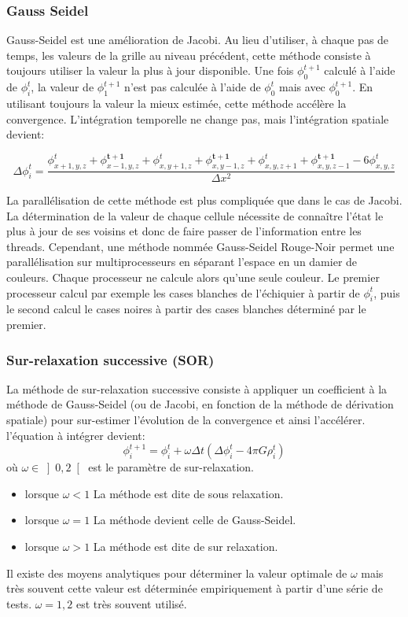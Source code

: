 \subsubsection{Gauss Seidel}
Gauss-Seidel est une amélioration de Jacobi. Au lieu d'utiliser, à chaque pas de temps, les valeurs de la grille au niveau précédent, cette méthode consiste à toujours utiliser la valeur la plus à jour disponible. Une fois $\phi^{t+1}_0$ calculé à l'aide de $\phi^{t}_i$, la valeur de $\phi^{t+1}_1$ n'est pas calculée à l'aide de $\phi^{t}_0$ mais avec $\phi^{t+1}_0$. En utilisant toujours la valeur la mieux estimée, cette méthode accélère la convergence. L'intégration temporelle ne change pas, mais l'intégration spatiale devient: 

\[ \Delta \phi_i^t = \dfrac{\phi_{x+1,y,z}^t  + \phi_{x-1,y,z}^\mathbf{t+1} + \phi_{x,y+1,z}^t  + \phi_{x,y-1,z}^\mathbf{t+1} + \phi_{x,y,z+1}^t + \phi_{x,y,z-1}^\mathbf{t+1}	- 6\phi_{x,y,z}^t}{\Delta x ^2} \]

La parallélisation de cette méthode est plus compliquée que dans le cas de Jacobi. La détermination de la valeur de chaque cellule nécessite de connaître l'état le plus à jour de ses voisins et donc de faire passer de l'information entre les threads.
 Cependant, une méthode nommée Gauss-Seidel Rouge-Noir permet une parallélisation sur multiprocesseurs en séparant l'espace en un damier de couleurs. Chaque processeur ne calcule alors qu'une seule couleur. Le premier processeur calcul par exemple les cases blanches de l'échiquier à partir de $\phi_i^t$, puis le second calcul le cases noires à partir des cases blanches déterminé par le premier.


\subsubsection{Sur-relaxation successive (SOR)}
La méthode de sur-relaxation successive consiste à appliquer un coefficient à la méthode de Gauss-Seidel (ou de Jacobi, en fonction de la méthode de dérivation spatiale) pour sur-estimer l'évolution de la convergence et ainsi l'accélérer. l'équation à intégrer devient:
\[ \phi^{t+1}_i = \phi^{t}_i + \omega  \Delta t \left (\Delta \phi_i^t - 4 \pi G \rho^t_i \right )  \]
où $\omega \in \left] 0,2 \right [$ est le paramètre de sur-relaxation.
\begin{itemize}
\item lorsque $\omega <1$ La méthode est dite de sous relaxation.
\item lorsque $\omega =1$ La méthode devient celle de Gauss-Seidel.
\item lorsque $\omega >1$ La méthode est dite de sur relaxation.
\end{itemize}
Il existe des moyens analytiques pour déterminer la valeur optimale de $\omega$ mais très souvent cette valeur est déterminée empiriquement à partir d'une série de tests. $\omega = 1,2$ est très souvent utilisé.


